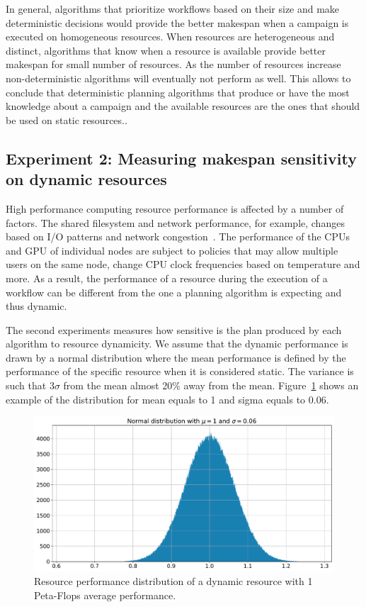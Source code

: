 In general, algorithms that prioritize workflows based on their size and make deterministic decisions would provide the better makespan when a campaign is executed on homogeneous resources.
When resources are heterogeneous and distinct, algorithms that know when a resource is available provide better makespan for small number of resources.
As the number of resources increase non-deterministic algorithms will eventually not perform as well.
This allows to conclude that deterministic planning algorithms that produce or have the most knowledge about a campaign and the available resources are the ones that should be used on static resources..


\subsection{Experiment 2: Measuring makespan sensitivity on dynamic resources}

High performance computing resource performance is affected by a number of factors.
The shared filesystem and network performance, for example, changes based on I/O patterns and network congestion~\cite{brown2018interference}.
The performance of the CPUs and GPU of individual nodes are subject to policies that may allow multiple users on the same node, change CPU clock frequencies based on temperature and more.
As a result, the performance of a resource during the execution of a workflow can be different from the one a planning algorithm is expecting and thus dynamic.

The second experiments measures how sensitive is the plan produced by each algorithm to resource dynamicity.
We assume that the dynamic performance is drawn by a normal distribution where the mean performance is defined by the performance of the specific resource when it is considered static.
The variance is such that $3\sigma$ from the mean almost 20\% away from the mean.
Figure~\ref{fig:dynamic_res} shows an example of the distribution for mean equals to 1 and sigma equals to 0.06.

\begin{figure}[ht!]
    \centering
    \includegraphics[width=.95\textwidth]{figures/campaign/DynRes.pdf}
    \caption{Resource performance distribution of a dynamic resource with 1 Peta-Flops average performance.}
    \label{fig:dynamic_res}
\end{figure}

